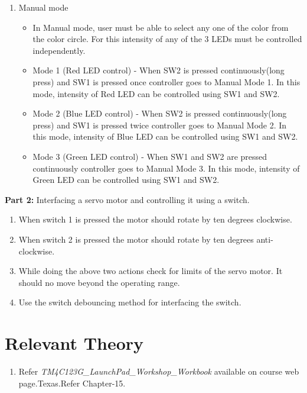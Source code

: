 \documentclass[a4paper,12pt,oneside]{book}
\begin{document}
\begin{enumerate}
\item Manual mode
\begin{itemize}
\item In Manual mode, user must be able to select any one of the color from the color circle. For this
intensity of any of the 3 LEDs must be controlled independently.
\item Mode 1 (Red LED control) - When SW2 is pressed continuously(long press) and SW1 is pressed
once controller goes to Manual Mode 1. In this mode, intensity of Red LED can be controlled using
SW1 and SW2.
\item Mode 2 (Blue LED control) - When SW2 is pressed continuously(long press) and SW1 is pressed
twice controller goes to Manual Mode 2. In this mode, intensity of Blue LED can be controlled using
SW1 and SW2.
\item Mode 3 (Green LED control) - When SW1 and SW2 are pressed continuously controller goes to
Manual Mode 3. In this mode, intensity of Green LED can be controlled using SW1 and SW2.
\end{itemize}

\end{enumerate}
\textbf{Part 2:}
Interfacing a servo motor and controlling it using a switch.
\begin{enumerate}
\item When switch 1 is pressed the motor should rotate by ten degrees clockwise.
\item When switch 2 is pressed the motor should rotate by ten degrees anti-clockwise.
\item While doing the above two actions check for limits of the servo motor. It should no move beyond the operating range.
\item Use the switch debouncing method for interfacing the switch.
\end{enumerate}




 
\section {Relevant Theory}
\begin{enumerate}
\item  Refer \textit {TM4C123G\_LaunchPad\_Workshop\_Workbook} available on course web page.Texas.Refer Chapter-15. 
\end{enumerate}

\end{document}
